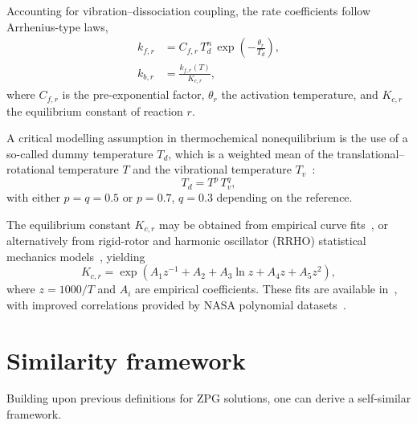 Accounting for vibration–dissociation coupling, the rate coefficients follow Arrhenius-type laws,
%
\begin{align}
    k_{f,r} &= C_{f,r}\,T_d^{n}\,\exp\!\left(-\frac{\theta_r}{T_d}\right), \\
    k_{b,r} &= \frac{k_{f,r}(T)}{K_{c,r}},
\end{align}
%
where $C_{f,r}$ is the pre-exponential factor, $\theta_r$ the activation temperature, and $K_{c,r}$ the equilibrium constant of reaction $r$.  

A critical modelling assumption in thermochemical nonequilibrium is the use of a so-called dummy temperature $T_d$, which is a weighted mean of the translational–rotational temperature $T$ and the vibrational temperature $T_v$~\citep{Park1990}:
%
\begin{equation}\label{equation:twotemperature}
    T_d = T^{p} \, T_v^{q},
\end{equation}
%
with either $p=q=0.5$ or $p=0.7$, $q=0.3$ depending on the reference.  

The equilibrium constant $K_{c,r}$ may be obtained from empirical curve fits~\citep{Park1985}, or alternatively from rigid-rotor and harmonic oscillator (RRHO) statistical mechanics models~\citep{miromiroThesis}, yielding
%
\begin{equation}
    K_{c,r} = \exp\!\left(A_1 z^{-1} + A_2 + A_3 \ln z + A_4 z + A_5 z^2 \right),
\end{equation}
%
where $z=1000/T$ and $A_i$ are empirical coefficients. These fits are available in~\citep{Park1985,Park1990,park2001}, with improved correlations provided by NASA polynomial datasets~\citep{nasa7,nasa9}.


\section{Similarity framework}\label{section:similarityframework}
Building upon previous definitions for ZPG solutions, one can derive a self-similar framework.


